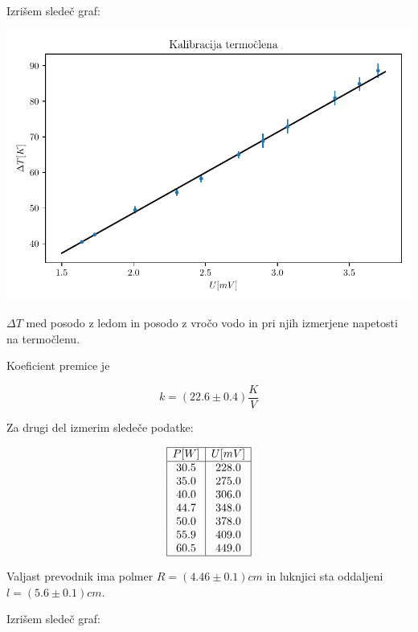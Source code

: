 \documentclass[12pt]{report}
\begin{document}
Izrišem sledeč graf: 

\begin{slika}[H]
  \centering
  \includegraphics{kalibracija}
  \caption{\small $\Delta T$ med posodo z ledom in posodo z vročo vodo in pri njih izmerjene napetosti na termočlenu. }
\end{slika}

Koeficient premice je 

\[ k = (22.6 \pm 0.4) \frac{K}{V}\]


Za drugi del izmerim sledeče podatke: 


\begin{tabela}[H]
  \centering
  \[
  \begin{array}{|c|c|}\hline
    P[W] & U[mV] \\ \hline
    30.5 &   228.0\\
    35.0 &   275.0\\
    40.0 &   306.0\\
    44.7 &   348.0\\
    50.0 &   378.0\\
    55.9 &   409.0\\
    60.5 &   449.0 \\ \hline
\end{array}
\]
\end{tabela}

Valjast prevodnik ima polmer $R = (4.46 \pm 0.1)cm$ in luknjici sta oddaljeni $l = (5.6 \pm 0.1)cm$. 

Izrišem sledeč graf: 
\end{document}
